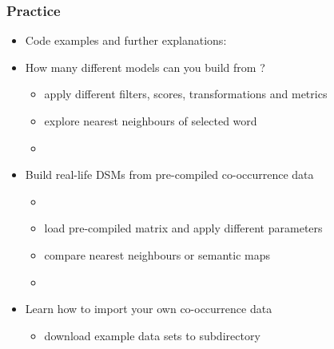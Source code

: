 \documentclass[t]{beamer} %
\begin{document}
\begin{frame}
  \frametitle{Practice}
  \begin{itemize}
  \item Code examples and further explanations: 
  \item How many different models can you build from ?
    \begin{itemize}
    \item apply different filters, scores, transformations and metrics
    \item[\hand] explore nearest neighbours of selected word
    \item[]
    \end{itemize}
  \item Build real-life DSMs from pre-compiled co-occurrence data
    \begin{itemize}
    \item {}
    \item load pre-compiled matrix and apply different parameters
    \item[\hand] compare nearest neighbours or semantic maps
    \item[]
    \end{itemize}
  \item Learn how to import your own co-occurrence data\\
    \hand{} 
    \begin{itemize}
    \item download example data sets to subdirectory 
    \end{itemize}
  \end{itemize}
\end{frame}



\end{document}
